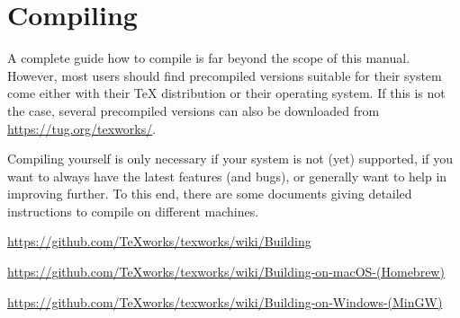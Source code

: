 
\chapter{Compiling {\Tw}}
\label{sec.compiling}

A complete guide how to compile {\Tw} is far beyond the scope of this manual. However, most users should find precompiled versions suitable for their system come either with their {\TeX} distribution or their operating system. If this is not the case, several precompiled versions can also be downloaded from \url{https://tug.org/texworks/}.

Compiling {\Tw} yourself is only necessary if your system is not (yet) supported, if you want to always have the latest features (and bugs), or generally want to help in improving {\Tw} further. To this end, there are some documents giving detailed instructions to compile {\Tw} on different machines.

\begin{OSLinux}
\noindent\url{https://github.com/TeXworks/texworks/wiki/Building} \\
\end{OSLinux}

\begin{OSMac}
\noindent\raggedright\url{https://github.com/TeXworks/texworks/wiki/Building-on-macOS-(Homebrew)} \\
\end{OSMac}

\begin{OSWindows}
\noindent\raggedright\url{https://github.com/TeXworks/texworks/wiki/Building-on-Windows-(MinGW)} \\
\end{OSWindows}
